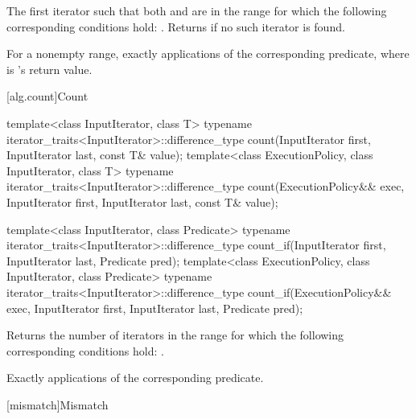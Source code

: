 \begin{itemdescr}
\pnum
\returns
The first iterator
such that both
and
are in
the range
for which
the following corresponding conditions hold:
.
Returns 
if no such iterator is found.

\pnum
\complexity
For a nonempty range, exactly
applications of the corresponding predicate, where  is
's
return value.
\end{itemdescr}

[alg.count]{Count}

%
%
\begin{itemdecl}
template<class InputIterator, class T>
  typename iterator_traits<InputIterator>::difference_type
     count(InputIterator first, InputIterator last, const T& value);
template<class ExecutionPolicy, class InputIterator, class T>
  typename iterator_traits<InputIterator>::difference_type
    count(ExecutionPolicy&& exec, InputIterator first, InputIterator last, const T& value);

template<class InputIterator, class Predicate>
  typename iterator_traits<InputIterator>::difference_type
    count_if(InputIterator first, InputIterator last, Predicate pred);
template<class ExecutionPolicy, class InputIterator, class Predicate>
  typename iterator_traits<InputIterator>::difference_type
    count_if(ExecutionPolicy&& exec, InputIterator first, InputIterator last, Predicate pred);
\end{itemdecl}

\begin{itemdescr}
\pnum
\effects
Returns the number of iterators
in the range 
for which the following corresponding
conditions hold:
.

\pnum
\complexity
Exactly
applications of the corresponding predicate.
\end{itemdescr}

[mismatch]{Mismatch}

